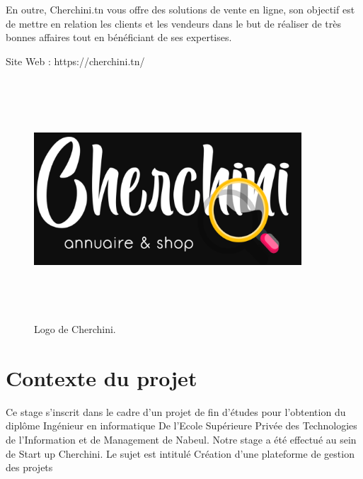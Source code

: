 \bigskip
 En outre, Cherchini.tn vous offre des solutions de vente en ligne, son objectif
est de mettre en relation les clients et les vendeurs dans le but de r\'{e}aliser de
tr\`{e}s bonnes affaires tout en b\'{e}n\'{e}ficiant de ses expertises.

Site Web : https://cherchini.tn/

\bigskip

  \FloatBarrier
\begin{figure}[H]
\center
\includegraphics[width=10cm,height=9cm]{./figures/cherchini-logo.png}
\caption{Logo de Cherchini.}

\end{figure}


\section{Contexte du projet }
Ce stage s'inscrit dans le cadre d'un projet de fin d'\'{e}tudes pour l'obtention du
dipl\^{o}me Ing\'{e}nieur en informatique De l'Ecole Sup\'{e}rieure Priv\'{e}e des
Technologies de l'Information et de Management de Nabeul.
Notre stage a \'{e}t\'{e} effectu\'{e} au sein de Start up Cherchini.
Le sujet est intitul\'{e} \guillemotleft{}Cr\'{e}ation d'une plateforme de gestion des projets\guillemotright{}



